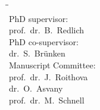 \begin{titlepage}
\begin{center}
    \end{center}
    \clearpage

    \thispagestyle{empty}

    \begin{tabbing}
        \hspace{\tabcolsep}\=\hspace{0.33\textwidth}\=\hspace{0.66\textwidth}\\[-3\medskipamount]

        \> PhD supervisor:\\[\smallskipamount]
        \> prof.\ dr.\ B.\ Redlich\\[\bigskipamount]
        
        \> PhD co-supervisor:\\[\smallskipamount]
        \> dr.\ S.\ Brünken\\[\bigskipamount]
        
        \> Manuscript Committee: \\[\smallskipamount]
        \> prof.\ dr.\ J.\ Roithova\\
        \> dr.\ O.\ Asvany\\
        \> prof.\ dr.\ M.\ Schnell\\[\medskipamount]
    \end{tabbing}

\end{titlepage}
\cleardoublepage
